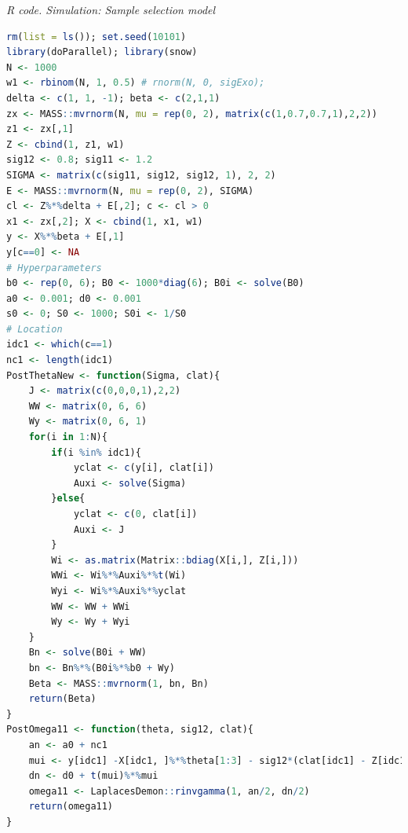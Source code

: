 \begin{tcolorbox}[enhanced,width=4.67in,center upper,
	fontupper=\large\bfseries,drop shadow southwest,sharp corners]
	\textit{R code. Simulation: Sample selection model}
	\begin{VF}
		\begin{lstlisting}[language=R]	
rm(list = ls()); set.seed(10101)
library(doParallel); library(snow)
N <- 1000
w1 <- rbinom(N, 1, 0.5) # rnorm(N, 0, sigExo); 
delta <- c(1, 1, -1); beta <- c(2,1,1)
zx <- MASS::mvrnorm(N, mu = rep(0, 2), matrix(c(1,0.7,0.7,1),2,2))
z1 <- zx[,1]
Z <- cbind(1, z1, w1)
sig12 <- 0.8; sig11 <- 1.2
SIGMA <- matrix(c(sig11, sig12, sig12, 1), 2, 2)
E <- MASS::mvrnorm(N, mu = rep(0, 2), SIGMA)
cl <- Z%*%delta + E[,2]; c <- cl > 0
x1 <- zx[,2]; X <- cbind(1, x1, w1)
y <- X%*%beta + E[,1]
y[c==0] <- NA
# Hyperparameters
b0 <- rep(0, 6); B0 <- 1000*diag(6); B0i <- solve(B0)
a0 <- 0.001; d0 <- 0.001
s0 <- 0; S0 <- 1000; S0i <- 1/S0
# Location
idc1 <- which(c==1)
nc1 <- length(idc1)
PostThetaNew <- function(Sigma, clat){
	J <- matrix(c(0,0,0,1),2,2)
	WW <- matrix(0, 6, 6)
	Wy <- matrix(0, 6, 1)
	for(i in 1:N){
		if(i %in% idc1){
			yclat <- c(y[i], clat[i])
			Auxi <- solve(Sigma)
		}else{
			yclat <- c(0, clat[i])
			Auxi <- J
		}
		Wi <- as.matrix(Matrix::bdiag(X[i,], Z[i,]))
		WWi <- Wi%*%Auxi%*%t(Wi)
		Wyi <- Wi%*%Auxi%*%yclat
		WW <- WW + WWi
		Wy <- Wy + Wyi
	}
	Bn <- solve(B0i + WW)
	bn <- Bn%*%(B0i%*%b0 + Wy)
	Beta <- MASS::mvrnorm(1, bn, Bn)
	return(Beta)
}
PostOmega11 <- function(theta, sig12, clat){
	an <- a0 + nc1
	mui <- y[idc1] -X[idc1, ]%*%theta[1:3] - sig12*(clat[idc1] - Z[idc1,]%*%theta[4:6])
	dn <- d0 + t(mui)%*%mui
	omega11 <- LaplacesDemon::rinvgamma(1, an/2, dn/2)
	return(omega11)
}
\end{lstlisting}
\end{VF}
\end{tcolorbox}  

